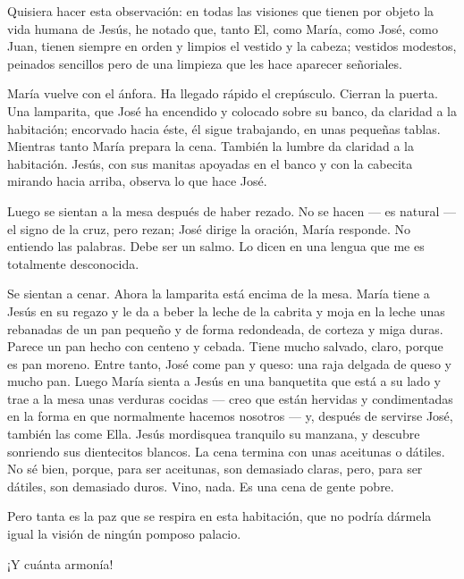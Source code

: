 \documentclass[12pt, twoside, openright]{book} %
\begin{document}
Quisiera hacer esta observación: en todas las visiones que tienen por objeto la vida humana de Jesús, he notado que, tanto El, como María, como José, como Juan, tienen siempre en orden y limpios el vestido y la cabeza; vestidos modestos, peinados sencillos pero de una limpieza que les hace aparecer señoriales. 

María vuelve con el ánfora. Ha llegado rápido el crepúsculo. Cierran la puerta. Una lamparita, que José ha encendido y colocado sobre su banco, da claridad a la habitación; encorvado hacia éste, él sigue trabajando, en unas pequeñas tablas. Mientras tanto María prepara la cena. También la lumbre da claridad a la habitación. Jesús, con sus manitas apoyadas en el banco y con la cabecita mirando hacia arriba, observa lo que hace José. 

Luego se sientan a la mesa después de haber rezado. No se hacen — es natural — el signo de la cruz, pero rezan; José dirige la oración, María responde. No entiendo las palabras. Debe ser un salmo. Lo dicen en una lengua que me es totalmente desconocida. 

Se sientan a cenar. Ahora la lamparita está encima de la mesa. María tiene a Jesús en su regazo y le da a beber la leche de la cabrita y moja en la leche unas rebanadas de un pan pequeño y de forma redondeada, de corteza y miga duras. Parece un pan hecho con centeno y cebada. Tiene mucho salvado, claro, porque es pan moreno. Entre tanto, José come pan y queso: una raja delgada de queso y mucho pan. Luego María sienta a Jesús en una banquetita que está a su lado y trae a la mesa unas verduras cocidas — creo que están hervidas y condimentadas en la forma en que normalmente hacemos nosotros — y, después de servirse José, también las come Ella. Jesús mordisquea tranquilo su manzana, y descubre sonriendo sus dientecitos blancos. La cena termina con unas aceitunas o dátiles. No sé bien, porque, para ser aceitunas, son demasiado claras, pero, para ser dátiles, son demasiado duros. Vino, nada. Es una cena de gente pobre. 

Pero tanta es la paz que se respira en esta habitación, que no podría dármela igual la visión de ningún pomposo palacio. 

¡Y cuánta armonía! 
\end{document}
